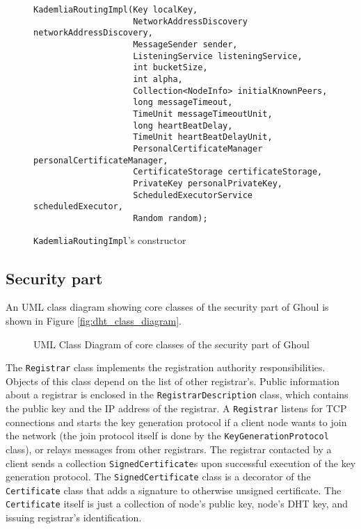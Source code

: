 \begin{figure}[tbp]
\begin{lstlisting}
KademliaRoutingImpl(Key localKey,
                    NetworkAddressDiscovery networkAddressDiscovery,
                    MessageSender sender,
                    ListeningService listeningService,
                    int bucketSize,
                    int alpha,
                    Collection<NodeInfo> initialKnownPeers,
                    long messageTimeout,
                    TimeUnit messageTimeoutUnit,
                    long heartBeatDelay,
                    TimeUnit heartBeatDelayUnit,
                    PersonalCertificateManager personalCertificateManager,
                    CertificateStorage certificateStorage,
                    PrivateKey personalPrivateKey,
                    ScheduledExecutorService scheduledExecutor,
                    Random random);
\end{lstlisting}
\caption{\texttt{KademliaRoutingImpl}'s constructor}
\label{fig:routing_constr_header}
\end{figure}

\subsection{Security part}

An UML class diagram showing core classes of the security part of Ghoul is shown
in Figure \ref{fig:dht_class_diagram}.

\begin{figure}[tbp]
  \centering
  \resizebox{\columnwidth}{!}{}
\caption{UML Class Diagram of core classes of the security part of Ghoul}
\label{fig:sec_class_diagram}
\end{figure}

The \texttt{Registrar} class implements the registration authority
responsibilities.
Objects of this class depend on the list of other registrar's.
Public information about a registrar is enclosed in the
\texttt{RegistrarDescription} class, which contains the public key and the IP
address of the registrar.
A \texttt{Registrar} listens for TCP connections and starts the key generation
protocol if a client node wants to join the network (the join protocol itself is
done by the \texttt{KeyGenerationProtocol} class), or relays messages from other
registrars.
The registrar contacted by a client sends a collection
\texttt{SignedCertificate}s upon successful execution of the key generation
protocol.
The \texttt{SignedCertificate} class is a decorator of the \texttt{Certificate}
class that adds a signature to otherwise unsigned certificate.
The \texttt{Certificate} itself is just a collection of node's public key,
node's DHT key, and issuing registrar's identification.

